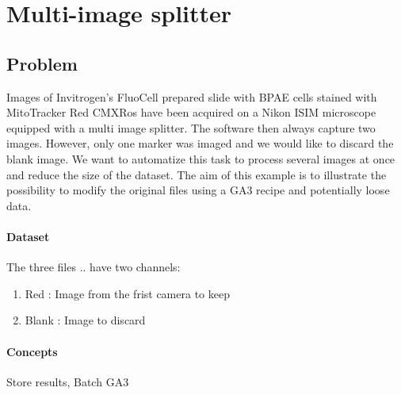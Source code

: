 \section{Multi-image splitter}

\subsection{Problem}

Images of Invitrogen's FluoCell prepared slide with BPAE cells stained with MitoTracker Red CMXRos have been acquired on a Nikon ISIM microscope equipped with a multi image splitter. The software then always capture two images. However, only one marker was imaged and we would like to discard the blank image. We want to automatize this task to process several images at once and reduce the size of the dataset. The aim of this example is to illustrate the possibility to modify the original files using a GA3 recipe and potentially loose data.

\paragraph{Dataset} The three files  ..   have two channels:
    \begin{enumerate}
        \item Red : Image from the frist camera to keep
        \item Blank : Image to discard
    \end{enumerate}

\paragraph{Concepts} Store results, Batch GA3


